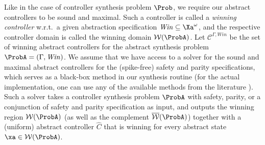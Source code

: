 Like in the case of controller synthesis problem $\Prob$, we require our abstract controllers to be sound and maximal.
Such a controller is called a \emph{winning controller} w.r.t.\ a given abstraction specification $\mathit{Win}\subseteq \Xa^\omega$, and the respective controller domain is called the winning domain $\mathcal W(\ProbA)$.
Let $\mathcal{C}^{\Gamma,\mathit{Win}}$ be the set of winning abstract controllers for the abstract synthesis problem $\ProbA=(\Gamma,\mathit{Win})$.
We assume that we have access to a solver for the sound and maximal abstract controllers for the (spike-free) safety and parity specifications, which serves as a black-box method in our synthesis routine (for the actual implementation, one can use any of the available methods from the literature \cite{van2018oink}).
Such a solver takes a controller synthesis problem $\ProbA$ with safety, parity, or a conjunction of safety and parity specification as input, and outputs the winning region $\mathcal W(\ProbA)$ (as well as the complement $\overline{\mathcal W}(\ProbA)$) together with a (uniform) abstract controller $\widehat{C}$ that is winning for every abstract state $\xa \in \mathcal W(\ProbA)$.

